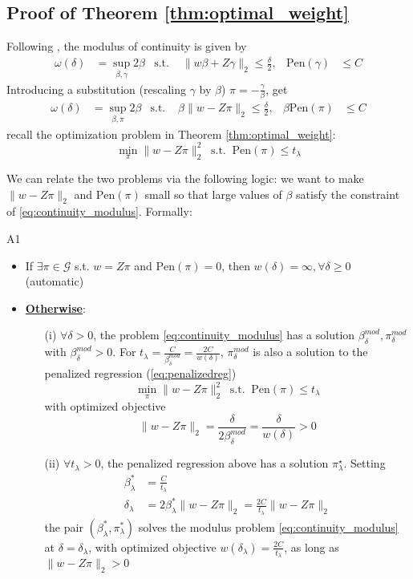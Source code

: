\documentclass{article}
\begin{document}
\subsection{Proof of Theorem \ref{thm:optimal_weight}}
Following \citet[Equation (25)]{armstrong2018optimal}, the modulus of continuity is given by 
\begin{align*}
  \omega(\delta) &=\sup_{\beta,\gamma}2\beta &\text{s.t.\ }&\lVert w\beta+Z\gamma \rVert_2 \leq \frac{\delta}{2}, &\mathrm{Pen}(\gamma) &\leq C
\end{align*}
Introducing a substitution (rescaling $\gamma$ by $\beta$) $\pi = -\frac{\gamma}{\beta}$, get 
\begin{align}\label{eq:continuity_modulus}
  \omega(\delta) &=\sup_{\beta,\pi}2\beta &\text{s.t.\ }&\beta\lVert w-Z\pi \rVert_2 \leq \frac{\delta}{2}, &\beta\mathrm{Pen}(\pi) &\leq C
\end{align}
recall the optimization problem in Theorem \ref{thm:optimal_weight}:
$$ \min_{\pi}\lVert w-Z\pi \rVert^2_2 \ \text{ s.t. }\ \mathrm{Pen}(\pi)\leq t_{\lambda} $$

We can relate the two problems via the following logic: we want to make $\lVert w-Z\pi \rVert_2$ and $\mathrm{Pen}(\pi)$ small so that large values of $\beta$ satisfy the constraint of \ref{eq:continuity_modulus}. Formally:
\begin{lemma}{}{A1}
  \begin{itemize}
    \item If $\exists \pi \in\mathcal{G}$ s.t. $w=Z\pi$ and $\mathrm{Pen}(\pi)=0$, then $w(\delta)=\infty,\forall \delta\geq 0$ \hfill (automatic)
    \item \textbf{\underline{Otherwise}}:
    \begin{itemize}
      \item[(i)] $\forall \delta>0$, the problem \ref{eq:continuity_modulus} has a solution $\beta^{mod}_{\delta},\pi^{mod}_{\delta}$ with $\beta^{mod}_{\delta}>0$. For $t_{\lambda}=\frac{C}{\beta^{mod}_{\delta}}=\frac{2C}{w(\delta)}$, $\pi^{mod}_{\delta}$ is also a solution to the penalized regression (\ref{eq:penalizedreg})
      $$ \min_{\pi}\lVert w-Z\pi \rVert^2_2 \ \text{ s.t. }\ \mathrm{Pen}(\pi)\leq t_{\lambda} $$
      with optimized objective 
      $$ \lVert w-Z\pi \rVert_2 = \frac{\delta}{2\beta_{\delta}^{mod}}=\frac{\delta}{w(\delta)} >0$$

      \item[(ii)] $\forall t_{\lambda}>0$, the penalized regression above has a solution $\pi^{\star}_{\lambda}$. Setting
      \begin{align*}
        \beta^*_{\lambda} &=\frac{C}{t_{\lambda}} \\
        \delta_{\lambda} &=2\beta^*_{\lambda}\lVert w-Z\pi \rVert_2 = \frac{2C}{t_{\lambda}}\lVert w-Z\pi \rVert_2
      \end{align*}
      the pair $\left(\beta^*_{\lambda},\pi^*_{\lambda}\right)$ solves the modulus problem \ref{eq:continuity_modulus} at $\delta=\delta_{\lambda}$, with optimized objective $w(\delta_{\lambda})=\frac{2C}{t_{\lambda}}$, as long as $\lVert w-Z\pi \rVert_2 >0$
    \end{itemize}
  \end{itemize}
\end{lemma}
\end{document}
